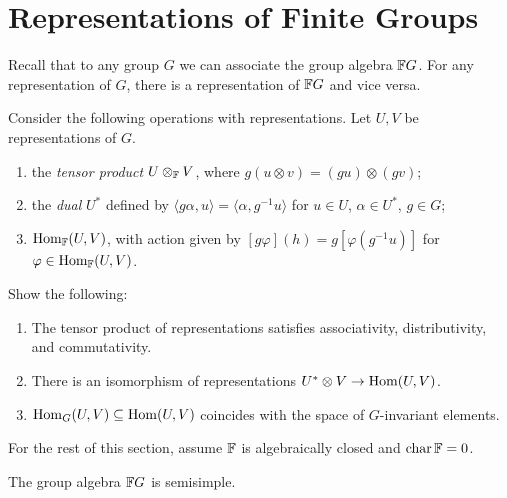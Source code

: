 \section{Representations of Finite Groups}

\begin{remark}
  Recall that to any group $G$ we can
  associate the group algebra
  $\mathbb{F} G$. For any representation of
  $G$, there is a representation
  of $\mathbb{F} G$ and vice versa.
\end{remark}

\begin{remark}
  Consider the following operations
  with representations. Let $U, V$
  be representations of $G$.
  \begin{enumerate}
    \item the \emph{tensor product} $U \otimes_{\mathbb{F}} V$, where
      $g(u \otimes v) = (g u) \otimes (gv)$;
    \item the \emph{dual} $U^*$
      defined by
      $\langle g \alpha, u \rangle = \langle \alpha, g^{-1} u \rangle$
      for $u \in U$, $\alpha \in U^*$,
      $g \in G$;
    \item $\operatorname{Hom}_{\mathbb{F}}(U, V)$, with
      action given by
      $[g \varphi](h) = g[\varphi(g^{-1} u)]$
      for $\varphi \in \operatorname{Hom}_{\mathbb{F}}(U, V)$.
  \end{enumerate}
\end{remark}

\begin{exercise}
  Show the following:
  \begin{enumerate}
    \item The tensor product of
      representations satisfies
      associativity, distributivity, and
      commutativity.
    \item There is an isomorphism
      of representations
      $U^* \otimes V \to \operatorname{Hom}(U, V)$.
    \item $\operatorname{Hom}_G(U, V) \subseteq \operatorname{Hom}(U, V)$
      coincides with the space
      of $G$-invariant elements.
  \end{enumerate}
\end{exercise}

\begin{remark}
  For the rest of this section,
  assume $\mathbb{F}$ is algebraically closed
  and $\operatorname{char} \mathbb{F} = 0$.
\end{remark}

\begin{theorem}
  The group algebra $\mathbb{F} G$ is semisimple.
\end{theorem}

